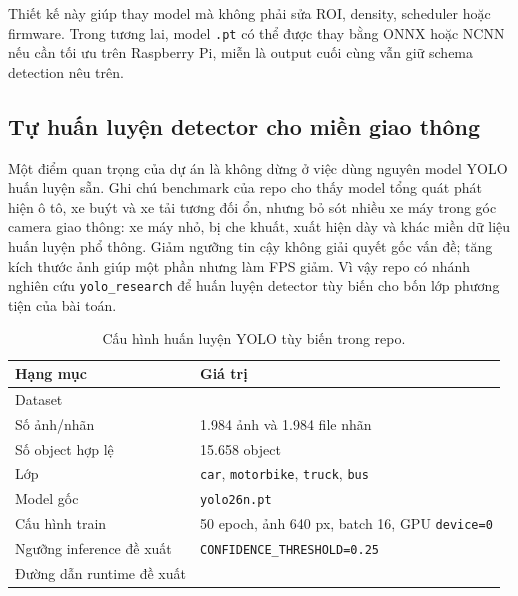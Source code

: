 Thiết kế này giúp thay model mà không phải sửa ROI, density, scheduler hoặc firmware. Trong tương lai, model \texttt{.pt} có thể được thay bằng ONNX hoặc NCNN nếu cần tối ưu trên Raspberry Pi, miễn là output cuối cùng vẫn giữ schema detection nêu trên.


\subsection{Tự huấn luyện detector cho miền giao thông}

Một điểm quan trọng của dự án là không dừng ở việc dùng nguyên model YOLO huấn luyện sẵn. Ghi chú benchmark của repo cho thấy model tổng quát phát hiện ô tô, xe buýt và xe tải tương đối ổn, nhưng bỏ sót nhiều xe máy trong góc camera giao thông: xe máy nhỏ, bị che khuất, xuất hiện dày và khác miền dữ liệu huấn luyện phổ thông. Giảm ngưỡng tin cậy không giải quyết gốc vấn đề; tăng kích thước ảnh giúp một phần nhưng làm FPS giảm. Vì vậy repo có nhánh nghiên cứu \texttt{yolo\_research} để huấn luyện detector tùy biến cho bốn lớp phương tiện của bài toán.

\begin{table}[H]
\centering
\caption{Cấu hình huấn luyện YOLO tùy biến trong repo.}
\label{tab:yolo-training-config}
\small
\setlength{\tabcolsep}{4pt}
\renewcommand{\arraystretch}{1.16}
\begin{tabularx}{\linewidth}{R{4.3cm}Y}
\toprule
\textbf{Hạng mục} & \textbf{Giá trị} \\
\midrule
Dataset &  \\
Số ảnh/nhãn & 1.984 ảnh và 1.984 file nhãn \\
Số object hợp lệ & 15.658 object \\
Lớp & \texttt{car}, \texttt{motorbike}, \texttt{truck}, \texttt{bus} \\
Model gốc & \texttt{yolo26n.pt} \\
Cấu hình train & 50 epoch, ảnh 640 px, batch 16, GPU \texttt{device=0} \\
Ngưỡng inference đề xuất & \texttt{CONFIDENCE\_THRESHOLD=0.25} \\
Đường dẫn runtime đề xuất &  \\
\bottomrule
\end{tabularx}
\normalsize
\end{table}

